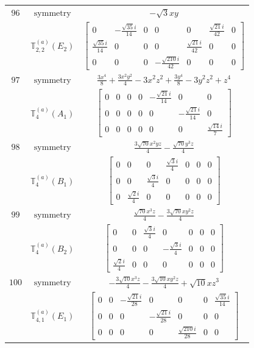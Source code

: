 \documentclass[fleqn,8pt,landscape]{jsarticle}
\begin{document}
\begin{longtable}{ccc}
$ 96 $ & $ \text{symmetry} $ & $ - \sqrt{3} x y $ \\
$  $ & $ \mathbb{T}_{2,2}^{(a)}(E_{2}) $ & $ \begin{bmatrix} 0 & - \frac{\sqrt{35} i}{14} & 0 & 0 & 0 & \frac{\sqrt{21} i}{42} & 0 \\ \frac{\sqrt{35} i}{14} & 0 & 0 & 0 & \frac{\sqrt{21} i}{42} & 0 & 0 \\ 0 & 0 & 0 & - \frac{\sqrt{210} i}{42} & 0 & 0 & 0 \end{bmatrix} $ \\ \hline
$ 97 $ & $ \text{symmetry} $ & $ \frac{3 x^{4}}{8} + \frac{3 x^{2} y^{2}}{4} - 3 x^{2} z^{2} + \frac{3 y^{4}}{8} - 3 y^{2} z^{2} + z^{4} $ \\
$  $ & $ \mathbb{T}_{4}^{(a)}(A_{1}) $ & $ \begin{bmatrix} 0 & 0 & 0 & 0 & - \frac{\sqrt{21} i}{14} & 0 & 0 \\ 0 & 0 & 0 & 0 & 0 & - \frac{\sqrt{21} i}{14} & 0 \\ 0 & 0 & 0 & 0 & 0 & 0 & \frac{\sqrt{14} i}{7} \end{bmatrix} $ \\ \hline
$ 98 $ & $ \text{symmetry} $ & $ \frac{3 \sqrt{70} x^{2} y z}{4} - \frac{\sqrt{70} y^{3} z}{4} $ \\
$  $ & $ \mathbb{T}_{4}^{(a)}(B_{1}) $ & $ \begin{bmatrix} 0 & 0 & 0 & \frac{\sqrt{3} i}{4} & 0 & 0 & 0 \\ 0 & 0 & \frac{\sqrt{3} i}{4} & 0 & 0 & 0 & 0 \\ 0 & \frac{\sqrt{2} i}{4} & 0 & 0 & 0 & 0 & 0 \end{bmatrix} $ \\ \hline
$ 99 $ & $ \text{symmetry} $ & $ \frac{\sqrt{70} x^{3} z}{4} - \frac{3 \sqrt{70} x y^{2} z}{4} $ \\
$  $ & $ \mathbb{T}_{4}^{(a)}(B_{2}) $ & $ \begin{bmatrix} 0 & 0 & \frac{\sqrt{3} i}{4} & 0 & 0 & 0 & 0 \\ 0 & 0 & 0 & - \frac{\sqrt{3} i}{4} & 0 & 0 & 0 \\ \frac{\sqrt{2} i}{4} & 0 & 0 & 0 & 0 & 0 & 0 \end{bmatrix} $ \\ \hline
$ 100 $ & $ \text{symmetry} $ & $ - \frac{3 \sqrt{10} x^{3} z}{4} - \frac{3 \sqrt{10} x y^{2} z}{4} + \sqrt{10} x z^{3} $ \\
$  $ & $ \mathbb{T}_{4,1}^{(a)}(E_{1}) $ & $ \begin{bmatrix} 0 & 0 & - \frac{\sqrt{21} i}{28} & 0 & 0 & 0 & \frac{\sqrt{35} i}{14} \\ 0 & 0 & 0 & - \frac{\sqrt{21} i}{28} & 0 & 0 & 0 \\ 0 & 0 & 0 & 0 & \frac{\sqrt{210} i}{28} & 0 & 0 \end{bmatrix} $ \\ \hline

\end{longtable}
\end{document}
